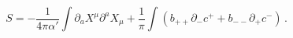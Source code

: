 \begin{equation}
S = -\frac{1}{4 \pi \alpha'}  \int 
\partial_a X^\mu \partial^a X_\mu
+ \frac{1}{ \pi}  \int \left( b_{++} \partial_-c^+ + b_{--} \partial_+
c^-\right)\,. 
\label{eq:gauge-fixed-action}
\end{equation}

